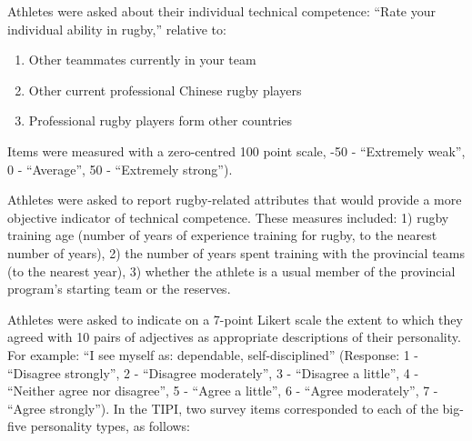 \begin{CJK}{UTF8}{gbsn}
Athletes were asked about their individual technical competence: ``Rate your individual ability in rugby,'' relative to:
\begin{enumerate}
  \item Other teammates currently in your team
  \item Other current professional Chinese rugby players
  \item Professional rugby players form other countries
\end{enumerate}
Items were measured with a zero-centred 100 point scale, -50 - ``Extremely weak'', 0 - ``Average'', 50 - ``Extremely strong'').



Athletes were asked to report rugby-related attributes that would provide a more objective indicator of technical competence. These measures included: 1) rugby training age (number of years of experience training for rugby, to the nearest number of years), 2) the number of years spent training with the provincial teams (to the nearest year), 3) whether the athlete is a usual member of the provincial program's starting team or the reserves.


Athletes were asked to indicate on a 7-point Likert scale the extent to which they agreed with 10 pairs of adjectives as appropriate descriptions of their personality. For example: ``I see myself as: dependable, self-disciplined'' (Response: 1 - ``Disagree strongly'', 2 - ``Disagree moderately'',  3 - ``Disagree a little'', 4 - ``Neither agree nor disagree'', 5 - ``Agree a little'', 6 - ``Agree moderately'', 7 - ``Agree strongly''). In the TIPI, two survey items corresponded to each of the big-five personality types, as follows:


\end{CJK}

